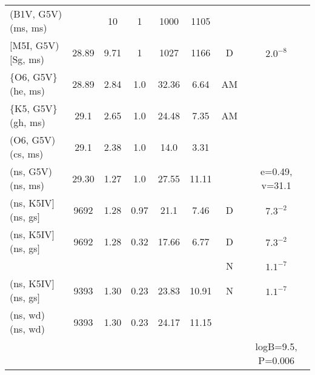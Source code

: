\documentclass{article}
\begin{document}
\begin{table}
\begin{tabular}{p{4cm}ccccccc}
(B1V, G5V) (ms, ms)	& 	& 10	& 1	& 1000	& 1105 	&   	&			\\
$[$M5I, G5V) $[$Sg, ms)	& 28.89	& 9.71	& 1	& 1027	& 1166 	& D 	& $2.0^{-8}$            \\
\{O6, G5V\} (he, ms)	& 28.89	& 2.84	& 1.0	& 32.36	& 6.64  & AM    &                       \\ 
\{K5, G5V\} (gh, ms)	& 29.1 	& 2.65	& 1.0	& 24.48	& 7.35  & AM    &                       \\ 
(O6, G5V) (cs, ms)	& 29.1 	& 2.38	& 1.0	& 14.0 	& 3.31  &       &                       \\ 
(ns,  G5V) (ns, ms)	& 29.30	& 1.27	& 1.0	& 27.55	& 11.11 &       & e=0.49, v=31.1        \\ 
(ns,  K5IV$]$ (ns, gs$]$	& 9692 	& 1.28	& 0.97	& 21.1 	& 7.46  & D     & $7.3^{-2}$            \\
(ns,  K5IV$]$ (ns, gs$]$	& 9692 	& 1.28	& 0.32	& 17.66	& 6.77  & D     & $7.3^{-2}$            \\
			&	& 	&	&	&	& N	& $1.1^{-7}$            \\
(ns,  K5IV$]$ (ns, gs$]$	& 9393 	& 1.30	& 0.23	& 23.83	& 10.91 & N     & $1.1^{-7}$            \\
(ns,  wd) (ns, wd)	& 9393 	& 1.30	& 0.23	& 24.17	& 11.15 &       &                       \\ 
			&	& 	&	&	&	& 	& logB=9.5, P=0.006 	\\ \hline
\end{tabular}
\end{table}
\end{document}
